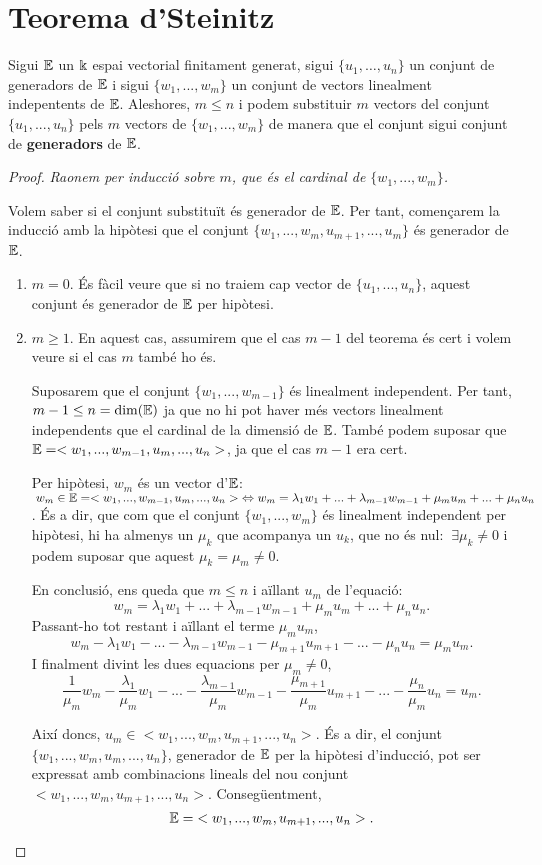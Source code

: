 \section{Teorema d'Steinitz}
Sigui $\mathbb{E}$ un $\Bbbk$ espai vectorial finitament generat, sigui $\{u_1,\dots, u_n\}$ un conjunt de generadors de $\mathbb{E}$ i sigui $\{w_1,..., w_m\}$ un conjunt de vectors linealment indepentents de $\mathbb{E}$. Aleshores, $m \leq n$ i podem substituir $m$ vectors del conjunt $\{u_1, ..., u_n\}$ pels $m$ vectors de $\{w_1,..., w_m\}$ de manera que el conjunt sigui conjunt de \textbf{generadors} de $\mathbb{E}$.
\\

\begin{proof}
\textit{Raonem per inducció sobre $m$, que és el cardinal de $\{w_1,..., w_m\}$.}

Volem saber si el conjunt substituït és generador de $\mathbb{E}$. Per tant, començarem la inducció amb la hipòtesi que el conjunt $\{w_1,..., w_m, u_{m+1}, ..., u_m\}$ és generador de $\mathbb{E}$.
\begin{enumerate}[(1)]
\item $m = 0$.
És fàcil veure que si no traiem cap vector de $\{u_1,..., u_n\}$, aquest conjunt és generador de $\mathbb{E}$ per hipòtesi.

\item $m \geq 1$. 
En aquest cas, assumirem que el cas $m-1$ del teorema és cert i volem veure si el cas $m$ també ho és.

Suposarem que el conjunt $\{w_1,..., w_{m-1}\}$ és linealment independent. Per tant, $m-1 \leq n = \dim(\mathbb{E})$ ja que no hi pot haver més vectors linealment independents que el cardinal de la dimensió de $\mathbb{E}$. També podem suposar que $\mathbb{E} = <w_1,...,w_{m-1},u_m,...,u_n>$, ja que el cas $m-1$ era cert.

Per hipòtesi, $w_m$ és un vector d'$\mathbb{E}$: $\:w_m \in \mathbb{E} = <w_1,...,w_{m-1},u_m,...,u_n> \;\Leftrightarrow  w_m = \lambda_1 w_1 + ... + \lambda_{m-1}w_{m-1} + \mu_mu_m + ... + \mu_nu_n$. És a dir, que com que el conjunt $\{w_1,..., w_m\}$ és linealment independent per hipòtesi, hi ha almenys un $\mu_k$ que acompanya un $u_k$, que no és nul: $\:\exists\mu_k \neq 0$ i podem suposar que aquest $\mu_k = \mu_m \neq 0$.

En conclusió, ens queda que $m \leq n$ i aïllant $u_m$ de l'equació:
\[
w_m = \lambda_1w_1 + ... + \lambda_{m-1}w_{m-1} + \mu_mu_m + ... + \mu_nu_n.
\]
Passant-ho tot restant i aïllant el terme $\mu_mu_m$,
\[
w_m - \lambda_1w_1 - ... - \lambda_{m-1}w_{m-1} - \mu_{m+1}u_{m+1} - ... - \mu_nu_n = \mu_mu_m.
\]
I finalment divint les dues equacions per $\mu_m \neq 0$,
\[
\frac{1}{\mu_m}w_m - \frac{\lambda_1}{\mu_m}w_1 - ... - \frac{\lambda_{m-1}}{\mu_m}w_{m-1} - \frac{\mu_{m+1}}{\mu_m}u_{m+1} - ... - \frac{\mu_n}{\mu_m}u_n = u_m.
\]

Així doncs, $u_m \in <w_1,...,w_m,u_{m+1},...,u_n>$. És a dir, el conjunt $\{w_1,...,w_m,u_{m},...,u_n\}$, generador de $\mathbb{E}$ per la hipòtesi d'inducció, pot ser expressat amb combinacions lineals del nou conjunt $<w_1,...,w_m,u_{m+1},...,u_n>$. Consegüentment, 
\[
\mathbb{E} = \;<w_1,...,w_m,u_{m+1},...,u_n>.
\]
\end{enumerate}
\end{proof}

